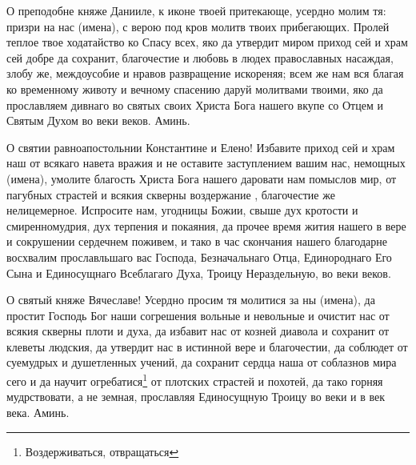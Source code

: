  


О преподобне княже Данииле, к иконе твоей притекающе, усердно молим тя: призри на нас (имена), с верою под  кров молитв твоих прибегающих.  Пролей теплое твое ходатайство ко Спасу всех,  яко да утвердит миром приход сей и храм сей добре да сохранит, благочестие и любовь в людех православных насаждая, злобу же, междоусобие и нравов развращение  искореняя; всем же нам вся благая ко временному животу и вечному спасению даруй молитвами твоими, яко да прославляем дивнаго во святых своих Христа Бога нашего вкупе со Отцем и Святым Духом во веки веков. Аминь.
\mychapterending

 


О святии равноапостольнии Константине и Елено! Избавите приход сей и храм наш от всякаго навета вражия и не оставите заступлением вашим нас, немощных (имена), умолите благость Христа Бога нашего даровати нам помыслов мир, от пагубных страстей и всякия скверны воздержание , благочестие же нелицемерное.  Испросите нам, угодницы Божии, свыше дух кротости и смиренномудрия, дух терпения и покаяния,  да прочее время жития нашего в вере и сокрушении сердечнем поживем, и тако в час скончания нашего благодарне восхвалим прославльшаго вас Господа, Безначальнаго Отца, Единороднаго Его Сына и Единосущнаго Всеблагаго Духа, Троицу Нераздельную, во веки веков.
\mychapterending

 


О святый княже Вячеславе! Усердно просим тя молитися за ны (имена), да простит Господь Бог наши согрешения вольные и невольные и очистит нас от всякия скверны плоти и духа, да избавит нас от козней диавола и сохранит от клеветы людския, да утвердит нас в истинной вере и благочестии, да соблюдет от суемудрых и душетленных учений, да сохранит сердца наша от соблазнов мира сего и да научит огребатися\footnote{Воздерживаться, отвращаться} от плотских страстей и похотей, да тако горняя мудрствовати, а не земная, прославляя Единосущную Троицу во веки и в век века. Аминь.
\mychapterending

